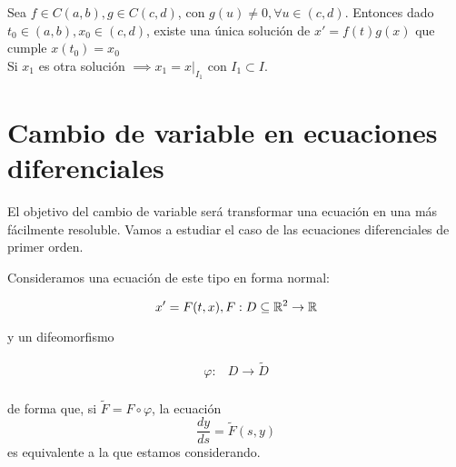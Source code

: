 \begin{nth}
Sea $f\in C(a,b), g\in C(c,d)$, con $g(u) \neq 0, \forall u \in (c,d)$. Entonces dado $t_0 \in (a,b), x_0 \in (c,d)$, existe una única solución de $x' = f(t)g(x)$ que cumple $x(t_0) = x_0$\\
Si $x_1$ es otra solución $\implies x_1 = x|_{I_1}$ con $I_1\subset I$.

\end{nth}

  
\section{Cambio de variable en ecuaciones diferenciales}
El objetivo del cambio de variable será transformar una ecuación en una más fácilmente resoluble.
Vamos a estudiar el caso de las ecuaciones diferenciales de primer orden.


Consideramos una ecuación de este tipo en forma normal:

\[
  x' = F(t, x), F : D \subseteq \mathbb{R}^2 \to \mathbb{R}
  \]

  y un difeomorfismo

  \[
  \begin{array}{lll}
    \varphi : & D \to \tilde{D} \\ 
  \end{array}
  \]

  de forma que, si $\tilde{F} = F \circ \varphi$, la ecuación
  \[ \dfrac{dy}{ds} = \tilde{F}(s, y) \]
  es equivalente a la que estamos considerando.



